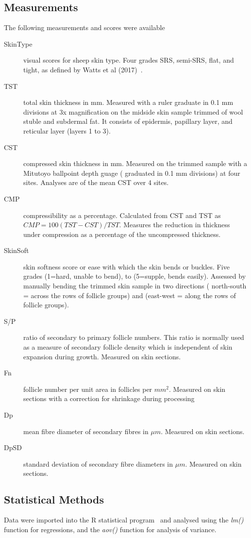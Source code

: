 \documentclass[titlepage]{article}  %
\begin{document}
\subsection{Measurements}
The following measurements and scores were available
\begin{description}
\item[SkinType] visual scores for sheep skin type. Four grades SRS, semi-SRS, flat, and tight, as defined by Watts et al (2017)~\cite{watt:17}.
\item[TST] total skin thickness in mm. Measured with a ruler graduate in 0.1 mm divisions at 3x magnification on the midside skin sample trimmed of wool stuble and subdermal fat. It consists of epidermis, papillary layer, and reticular layer (layers 1 to 3).
\item[CST] compressed skin thickness in mm. Measured on the trimmed sample with a Mitutoyo ballpoint depth guage ( graduated in 0.1 mm divisions) at four sites. Analyses are of the mean CST over 4 sites.
\item[CMP] compressibility as a percentage. Calculated from CST and TST as $CMP = 100(TST-CST)/TST$. Measures the reduction in thickness under compression as a percentage of the uncompressed thickness.
\item[SkinSoft] skin softness score or ease with which the skin bends or buckles. Five grades (1=hard, unable to bend), to (5=supple, bends easily). Assessed by manually bending the trimmed skin sample in two directions ( north-south = across the rows of follicle groups) and (east-west = along the rows of follicle groups).
\item[S/P] ratio of secondary to primary follicle numbers. This ratio is normally used as a measure of secondary follicle density which is independent of skin expansion during growth. Measured on skin sections.
\item[Fn] follicle number per unit area in follicles per $mm^{2}$. Measured on skin sections with a correction for shrinkage during processing
\item[Dp] mean fibre diameter of secondary fibres in $\mu m$. Measured on skin sections.
\item[DpSD] standard deviation of secondary fibre diameters in $\mu m$. Measured on skin sections.
\end{description}


\subsection{Statistical Methods}
Data were imported into the R statistical program~\cite{rprog:13} and analysed using the {\em lm()} function for regressions, and the {\em aov()} function for analysis of variance.
\end{document}
